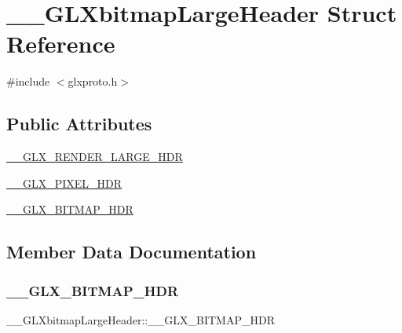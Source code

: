 \hypertarget{struct_____g_l_xbitmap_large_header}{}\section{\+\_\+\+\_\+\+G\+L\+Xbitmap\+Large\+Header Struct Reference}
\label{struct_____g_l_xbitmap_large_header}


{\ttfamily \#include $<$glxproto.\+h$>$}

\subsection*{Public Attributes}
\begin{DoxyCompactItemize}
\item 
\hyperlink{struct_____g_l_xbitmap_large_header_a9d44f9834c597a17c25369198b5c4f92}{\+\_\+\+\_\+\+G\+L\+X\+\_\+\+R\+E\+N\+D\+E\+R\+\_\+\+L\+A\+R\+G\+E\+\_\+\+H\+DR}
\item 
\hyperlink{struct_____g_l_xbitmap_large_header_aa049e1dc5ecbb9019953fc45c87b70d3}{\+\_\+\+\_\+\+G\+L\+X\+\_\+\+P\+I\+X\+E\+L\+\_\+\+H\+DR}
\item 
\hyperlink{struct_____g_l_xbitmap_large_header_ad8cc5a4372e5ca961b22871f9d623539}{\+\_\+\+\_\+\+G\+L\+X\+\_\+\+B\+I\+T\+M\+A\+P\+\_\+\+H\+DR}
\end{DoxyCompactItemize}


\subsection{Member Data Documentation}
\mbox{\label{struct_____g_l_xbitmap_large_header_ad8cc5a4372e5ca961b22871f9d623539}} 
\subsubsection{\texorpdfstring{\+\_\+\+\_\+\+G\+L\+X\+\_\+\+B\+I\+T\+M\+A\+P\+\_\+\+H\+DR}{\_\_GLX\_BITMAP\_HDR}}
{\footnotesize\ttfamily \+\_\+\+\_\+\+G\+L\+Xbitmap\+Large\+Header\+::\+\_\+\+\_\+\+G\+L\+X\+\_\+\+B\+I\+T\+M\+A\+P\+\_\+\+H\+DR}

